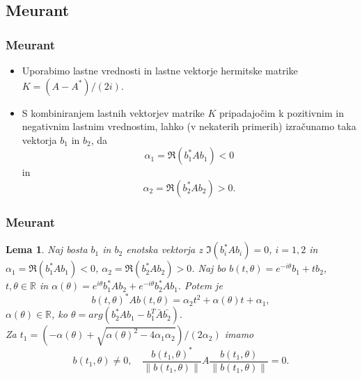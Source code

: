 \documentclass{beamer}
\newcommand{\norm}[1]{\left\lVert#1\right\rVert}
\newcommand{\R}{\mathbb R}
\newtheorem{lema}[izrek]{Lema}
\begin{document}
\subsection{Meurant}
\begin{frame}
\frametitle{Meurant}
\begin{itemize}
\item Uporabimo lastne vrednosti in lastne vektorje hermitske matrike $K=(A-A^\ast)/(2i)$.
\item S kombiniranjem lastnih vektorjev matrike $K$ pripadajočim k pozitivnim in negativnim lastnim vrednostim, lahko (v nekaterih primerih) izračunamo taka vektorja $b_1$ in $b_2$, da $$\alpha_1=\Re(b_1^\ast Ab_1)<0$$ in $$\alpha_2=\Re(b_2^\ast Ab_2)>0.$$
\end{itemize}
\end{frame}
\begin{frame}
\frametitle{Meurant}
\begin{lema}\label{komp}
Naj bosta $b_1$ in $b_2$ enotska vektorja z $\Im(b_i^\ast Ab_i)=0$, $i=1,2$ in \medskip $\alpha_1=\Re(b_1^\ast Ab_1)<0$,  $\alpha_2=\Re(b_2^\ast Ab_2)>0$. Naj bo $b(t,\theta)=e^{-i\theta}b_1 + tb_2$, $t, \theta \in \R$ in  $\alpha(\theta)=e^{i\theta}b_1^\ast Ab_2 +e^{-i\theta}b_2^\ast Ab_1.$ Potem je 
$$b(t,\theta)^\ast Ab(t,\theta)=\alpha_2 t^2 +\alpha(\theta)t+\alpha_1,$$ 
$\alpha(\theta)\in\R$, ko $\theta=arg(b_2^\ast Ab_1 -b_1^T\bar{A}\bar{b_2}).$\medskip \\ Za $t_1 =(-\alpha(\theta) +\sqrt{\alpha(\theta)^2 -4\alpha_1\alpha_2})/(2\alpha_2)$  imamo 
$$b(t_1, \theta) \not=0,\quad  \frac{b(t_1,\theta)^\ast}{\norm{b(t_1,\theta)}}A\frac{b(t_1,\theta)}{\norm{b(t_1,\theta)}}=0.$$
\end{lema}
\end{frame}
\end{document}
